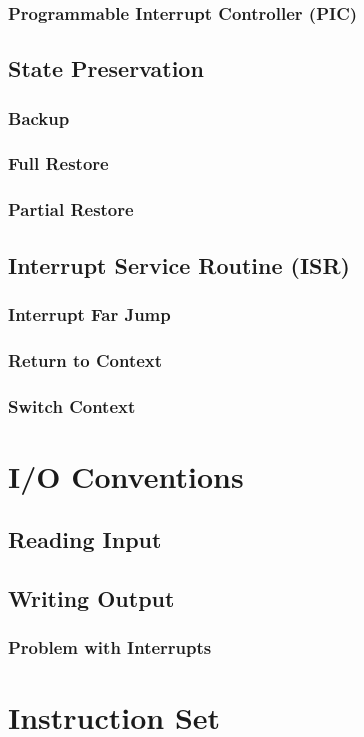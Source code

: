 \documentclass[oneside, a4paper]{memoir}
\begin{document}
\subsection{Programmable Interrupt Controller (PIC)}
\section{State Preservation}
\subsection{Backup}
\subsection{Full Restore}
\subsection{Partial Restore}
\section{Interrupt Service Routine (ISR)}
\subsection{Interrupt Far Jump}
\subsection{Return to Context}
\subsection{Switch Context}

\chapter{I/O Conventions}
\section{Reading Input}
\section{Writing Output}
\subsection{Problem with Interrupts}

\chapter{Instruction Set}
\end{document}
